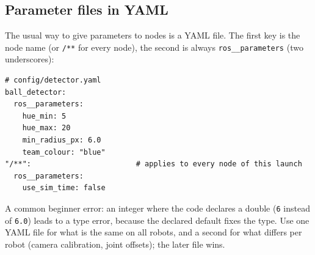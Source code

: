 \subsection*{Parameter files in YAML}
The usual way to give parameters to nodes is a YAML file. The first key is the node name (or \verb!/**! for every node), the second is always \verb!ros__parameters! (two underscores):
\begin{verbatim}
# config/detector.yaml
ball_detector:
  ros__parameters:
    hue_min: 5
    hue_max: 20
    min_radius_px: 6.0
    team_colour: "blue"
"/**":                        # applies to every node of this launch
  ros__parameters:
    use_sim_time: false
\end{verbatim}
A common beginner error: an integer where the code declares a double (\verb!6! instead of \verb!6.0!) leads to a type error, because the declared default fixes the type. Use one YAML file for what is the same on all robots, and a second for what differs per robot (camera calibration, joint offsets); the later file wins.

